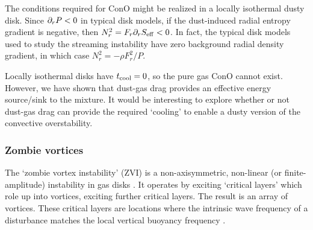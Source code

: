 The conditions required for ConO might be realized in a locally
isothermal dusty disk. Since $\partial_rP < 0$ in typical disk models, 
if the dust-induced radial entropy gradient is negative, then
$N_r^2  =  F_r \partial_rS_\mathrm{eff} < 0$. In 
fact, the typical disk models used to study the streaming
instability have zero background radial density gradient, in which
case  $N_r^2= -\rho F_r^2/P$.  

Locally isothermal disks have $t_\mathrm{cool}=0$, so the pure gas ConO cannot
exist. However, we have shown that dust-gas drag provides an effective
energy source/sink to the mixture. It would be
interesting to explore whether or not dust-gas drag can provide the
required `cooling' to enable a dusty version of the convective
overstability. 







\subsubsection{Zombie vortices}

The `zombie vortex instability' (ZVI) is a non-axisymmetric,
non-linear (or finite-amplitude) instability in gas disks
\citep{marcus15}. It operates by exciting `critical layers' which role
up into vortices, exciting further critical layers. The result is an
array of vortices. These critical
layers are locations where the intrinsic wave frequency of a
disturbance matches the local vertical buoyancy frequency
\citep{marcus13}.  

